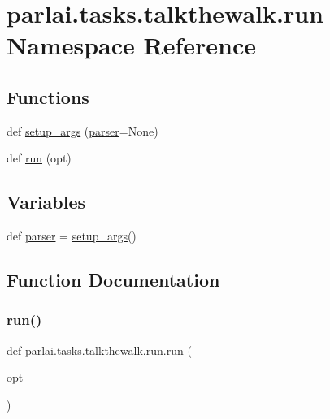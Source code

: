 \hypertarget{namespaceparlai_1_1tasks_1_1talkthewalk_1_1run}{}\section{parlai.\+tasks.\+talkthewalk.\+run Namespace Reference}
\label{namespaceparlai_1_1tasks_1_1talkthewalk_1_1run}
\subsection*{Functions}
\begin{DoxyCompactItemize}
\item 
def \hyperlink{namespaceparlai_1_1tasks_1_1talkthewalk_1_1run_a3534e8afa0a4dc25a6e02740fa35ac84}{setup\+\_\+args} (\hyperlink{namespaceparlai_1_1tasks_1_1talkthewalk_1_1run_ae9970664deea071fd837c1d8052c9025}{parser}=None)
\item 
def \hyperlink{namespaceparlai_1_1tasks_1_1talkthewalk_1_1run_a0a1ec08b8196cb008e4df83468c67e5b}{run} (opt)
\end{DoxyCompactItemize}
\subsection*{Variables}
\begin{DoxyCompactItemize}
\item 
def \hyperlink{namespaceparlai_1_1tasks_1_1talkthewalk_1_1run_ae9970664deea071fd837c1d8052c9025}{parser} = \hyperlink{namespaceparlai_1_1tasks_1_1talkthewalk_1_1run_a3534e8afa0a4dc25a6e02740fa35ac84}{setup\+\_\+args}()
\end{DoxyCompactItemize}


\subsection{Function Documentation}
\mbox{\label{namespaceparlai_1_1tasks_1_1talkthewalk_1_1run_a0a1ec08b8196cb008e4df83468c67e5b}} 
\subsubsection{\texorpdfstring{run()}{run()}}
{\footnotesize\ttfamily def parlai.\+tasks.\+talkthewalk.\+run.\+run (\begin{DoxyParamCaption}\item[{}]{opt }\end{DoxyParamCaption})}



